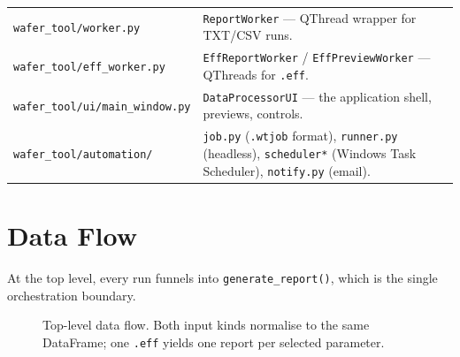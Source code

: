 \documentclass[11pt,a4paper]{article}
\newcommand{\code}[1]{\texttt{#1}}
\begin{document}
\begin{center}
\begin{longtable}{@{}p{4.6cm}p{10.2cm}@{}}
\texttt{wafer\_tool/worker.py} & \code{ReportWorker} --- QThread wrapper for TXT/CSV runs. \\
\texttt{wafer\_tool/eff\_worker.py} & \code{EffReportWorker} / \code{EffPreviewWorker} --- QThreads for \texttt{.eff}. \\
\texttt{wafer\_tool/ui/main\_window.py} & \code{DataProcessorUI} --- the application shell, previews, controls. \\
\texttt{wafer\_tool/automation/} & \code{job.py} (\texttt{.wtjob} format), \code{runner.py} (headless), \code{scheduler*} (Windows Task Scheduler), \code{notify.py} (email). \\
\bottomrule
\end{longtable}
\end{center}

\section{Data Flow}
At the top level, every run funnels into \code{generate_report()}, which is the
single orchestration boundary.

\begin{figure}[h]\centering
{}
\caption{Top-level data flow. Both input kinds normalise to the same DataFrame; one \texttt{.eff} yields one report per selected parameter.}
\end{figure}
\end{document}
